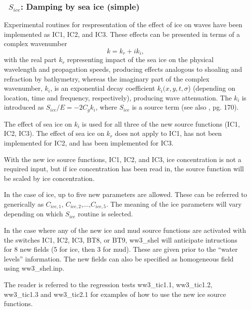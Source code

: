 \vsssub
\subsubsection{~$S_{ice}$: Damping by sea ice (simple)} \label{sec:ICE1}
\vsssub


\noindent
Experimental routines for respresentation of the effect of ice on waves have been implemented as IC1, IC2, and IC3. These effects can be presented in terms of a complex wavenumber 
\begin{equation}\label{eq:waveno}
     {k} = {k_r} + i{k_i},
\end{equation}
with the real part ${k_r}$ representing impact of the sea ice on the physical 
wavelength and
propagation speeds, producing effects analogous to shoaling and refraction by bathymetry,
whereas the imaginary part of the complex wavenumber, ${k_i}$, is an exponential decay 
coefficient ${k_i}({x},{y},{t},\sigma $) (depending on location, time and frequency, 
respectively), producing wave attenuation.  The ${k_i}$ is introduced as
${S_{ice}}/{E}=-2{C_g}{k_i}$, 
where ${S_{ice}}$ is a source term (see also \cite{bk:WAM94}, pg. 170).

The effect of sea ice on ${k_i}$ is used for all three of the new source functions (IC1, IC2, IC3). The effect of sea ice on ${k_r}$ does not apply to IC1, has not been implemented for IC2, and has been implemented for IC3.

With the new ice source functions, IC1, IC2, and IC3, ice concentration is not a required input, but if ice concentration has been read in, the source function will be scaled by ice concentration.

In the case of ice, up to five new parameters are
allowed. These can be
referred to generically as ${C_{ice,1}}$, ${C_{ice,2}}$,...,${C_{ice,5}}$.  
The meaning of the ice parameters will vary
depending on which ${S_{ice}}$ routine is selected. 

In the case where any of the new ice and mud source functions are activated with the switches
 {\code IC1}, {\code IC2},  {\code IC3},  {\code BT8}, or {\code BT9}, {\file ww3\_shel} will anticipate intructions for 8 new fields (5 for ice, then 3 for mud). These are given prior to the ``water levels'' information. The new fields can also be specified as homogeneous field using {\file ww3\_shel.inp}. 

The reader is referred to the regression tests {\file ww3\_tic1.1}, {\file ww3\_tic1.2}, {\file ww3\_tic1.3} and {\file ww3\_tic2.1} for examples of how to use the new ice source functions.

